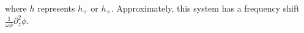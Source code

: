 \documentclass[
 jor,
 amsmath,amssymb,preprint,
]{revtex4-2}
\begin{document}
where $h$ represents $h_+$ or $h_\times$. Approximately, this system has a frequency shift $\frac{1}{\omega\phi}\partial_z^2\phi$.\begin{comment} This equation has the same form to the eq.\eqref{dessoleq} with $f(z) = \frac{2}{\phi}\nabla^2 \phi \approx 2\nabla^2\ln \phi$, $g(z) = \ln\phi$. Therefore the forward wave solution to eq.\eqref{desspteq1} is
\begin{equation}
\begin{aligned}
h^{(o)}_{ab}(\omega) = & \sqrt{\frac{G_o}{G_s}} \exp\bigg[iz \frac{ 4\nabla^2\ln \phi -\partial_z^2 \ln\phi}{4\omega} \bigg] h_{ab}^{(s)}(\omega) \\
= & \sqrt{\frac{G_o}{G_s}} \exp\bigg[-ikz \frac{ 4\nabla^2\ln G_o -\partial_z^2 \ln G_o}{4\omega^2} \bigg] h_{ab}^{(s)}(\omega) \,.
\label{ehsptsol}
\end{aligned}
\end{equation}
\textcolor{red}{The general form is ??}
\begin{equation}
h^{(o)}_{ab}(\omega) = \sqrt{\frac{G_o}{G_s}} \exp\bigg[ \frac{3\nabla^2 \ln G_o}{8\omega^2}\bigg] \exp\bigg[-i\frac{ 3\nabla^2 \ln G_o}{4\omega^2} \vec{k}\cdot\vec{r} \bigg] h_{ab}^{(s)}(\omega) ??
\end{equation}


\end{comment}
\end{document}
